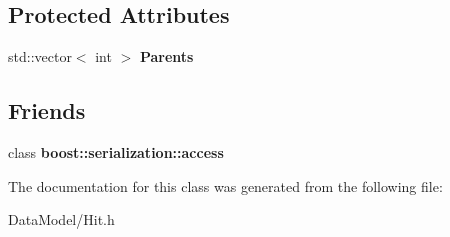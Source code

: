 \subsection*{Protected Attributes}
\begin{DoxyCompactItemize}
\item 
\hypertarget{classMCHit_a7fbd3892b201ed3790da046e63aed9d5}{
std::vector$<$ int $>$ {\bfseries Parents}}
\label{classMCHit_a7fbd3892b201ed3790da046e63aed9d5}

\end{DoxyCompactItemize}
\subsection*{Friends}
\begin{DoxyCompactItemize}
\item 
\hypertarget{classMCHit_ac98d07dd8f7b70e16ccb9a01abf56b9c}{
class {\bfseries boost::serialization::access}}
\label{classMCHit_ac98d07dd8f7b70e16ccb9a01abf56b9c}

\end{DoxyCompactItemize}


The documentation for this class was generated from the following file:\begin{DoxyCompactItemize}
\item 
DataModel/Hit.h\end{DoxyCompactItemize}
